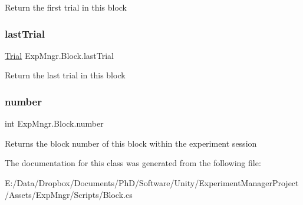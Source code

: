 Return the first trial in this block 

\mbox{\label{class_exp_mngr_1_1_block_aca2953db07804d8835904a0cbe5138d3}} 
\subsubsection{\texorpdfstring{last\+Trial}{lastTrial}}
{\footnotesize\ttfamily \hyperlink{class_exp_mngr_1_1_trial}{Trial} Exp\+Mngr.\+Block.\+last\+Trial\hspace{0.3cm}{\ttfamily [get]}}



Return the last trial in this block 

\mbox{\label{class_exp_mngr_1_1_block_a310d6c36e6955060d29d22b56440b16d}} 
\subsubsection{\texorpdfstring{number}{number}}
{\footnotesize\ttfamily int Exp\+Mngr.\+Block.\+number\hspace{0.3cm}{\ttfamily [get]}}



Returns the block number of this block within the experiment session 



The documentation for this class was generated from the following file\+:\begin{DoxyCompactItemize}
\item 
E\+:/\+Data/\+Dropbox/\+Documents/\+Ph\+D/\+Software/\+Unity/\+Experiment\+Manager\+Project/\+Assets/\+Exp\+Mngr/\+Scripts/Block.\+cs\end{DoxyCompactItemize}
